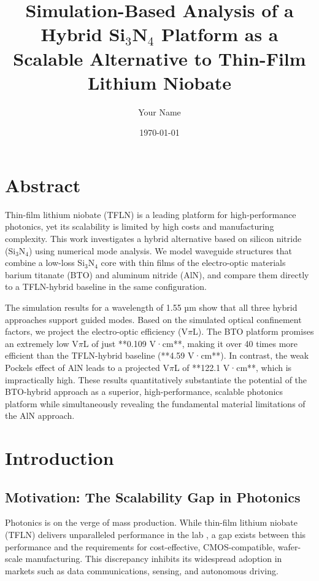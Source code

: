 \documentclass[12pt, a4paper, numbers]{report}
\title{Simulation-Based Analysis of a Hybrid Si$_3$N$_4$ Platform as a Scalable Alternative to Thin-Film Lithium Niobate}
\author{Your Name}
\date{\today}
\begin{document}

\maketitle
\tableofcontents
\listoffigures
\listoftables

\chapter*{Abstract}
Thin-film lithium niobate (TFLN) is a leading platform for high-performance photonics, yet its scalability is limited by high costs and manufacturing complexity. This work investigates a hybrid alternative based on silicon nitride (Si$_3$N$_4$) using numerical mode analysis. We model waveguide structures that combine a low-loss Si$_3$N$_4$ core with thin films of the electro-optic materials barium titanate (BTO) and aluminum nitride (AlN), and compare them directly to a TFLN-hybrid baseline in the same configuration.

The simulation results for a wavelength of 1.55 µm show that all three hybrid approaches support guided modes. Based on the simulated optical confinement factors, we project the electro-optic efficiency (V$\pi$L). The BTO platform promises an extremely low V$\pi$L of just **0.109 V·cm**, making it over 40 times more efficient than the TFLN-hybrid baseline (**4.59 V·cm**). In contrast, the weak Pockels effect of AlN leads to a projected V$\pi$L of **122.1 V·cm**, which is impractically high. These results quantitatively substantiate the potential of the BTO-hybrid approach as a superior, high-performance, scalable photonics platform while simultaneously revealing the fundamental material limitations of the AlN approach.

\chapter{Introduction}
\section{Motivation: The Scalability Gap in Photonics}
Photonics is on the verge of mass production. While thin-film lithium niobate (TFLN) delivers unparalleled performance in the lab \cite{TFLNreview}, a gap exists between this performance and the requirements for cost-effective, CMOS-compatible, wafer-scale manufacturing. This discrepancy inhibits its widespread adoption in markets such as data communications, sensing, and autonomous driving.
\end{document}
